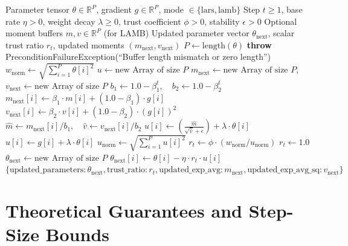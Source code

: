 \documentclass[11pt,a4paper]{article}
\theoremstyle{definition}
\begin{document}
\begin{algorithm}[H]
\caption{Layer-Wise Adaptive Optimization (LARS / LAMB)}
\begin{algorithmic}[1]
\Require Parameter tensor $\theta \in \mathbb{R}^P$, gradient $g \in \mathbb{R}^P$, mode $\in \{\text{lars}, \text{lamb}\}$
\Require Step $t \ge 1$, base rate $\eta > 0$, weight decay $\lambda \ge 0$, trust coefficient $\phi > 0$, stability $\epsilon > 0$
\Require Optional moment buffers $m, v \in \mathbb{R}^P$ (for LAMB)
\Ensure Updated parameter vector $\theta_{\text{next}}$, scalar trust ratio $r_t$, updated moments $(m_{\text{next}}, v_{\text{next}})$
\State $P \gets \text{length}(\theta)$
    \State \textbf{throw} PreconditionFailureException(``Buffer length mismatch or zero length'')
\EndIf
\State $w_{\text{norm}} \gets \sqrt{\sum_{i=1}^P \theta[i]^2}$
\State $u \gets \text{new Array of size } P$
\State $m_{\text{next}} \gets \text{new Array of size } P$, \quad $v_{\text{next}} \gets \text{new Array of size } P$
    \State $b_1 \gets 1.0 - \beta_1^t, \quad b_2 \gets 1.0 - \beta_2^t$
        \State $m_{\text{next}}[i] \gets \beta_1 \cdot m[i] + (1.0 - \beta_1) \cdot g[i]$
        \State $v_{\text{next}}[i] \gets \beta_2 \cdot v[i] + (1.0 - \beta_2) \cdot (g[i])^2$
        \State $\hat{m} \gets m_{\text{next}}[i] / b_1, \quad \hat{v} \gets v_{\text{next}}[i] / b_2$
        \State $u[i] \gets \left(\frac{\hat{m}}{\sqrt{\hat{v}} + \epsilon}\right) + \lambda \cdot \theta[i]$
    \EndFor
\Else
        \State $u[i] \gets g[i] + \lambda \cdot \theta[i]$
    \EndFor
\EndIf
\State $u_{\text{norm}} \gets \sqrt{\sum_{i=1}^P u[i]^2}$
    \State $r_t \gets \phi \cdot (w_{\text{norm}} / u_{\text{norm}})$
\Else
    \State $r_t \gets 1.0$
\EndIf
\State $\theta_{\text{next}} \gets \text{new Array of size } P$
    \State $\theta_{\text{next}}[i] \gets \theta[i] - \eta \cdot r_t \cdot u[i]$
\EndFor
\State \Return $\{\text{updated\_parameters}: \theta_{\text{next}}, \text{trust\_ratio}: r_t, \text{updated\_exp\_avg}: m_{\text{next}}, \text{updated\_exp\_avg\_sq}: v_{\text{next}}\}$
\end{algorithmic}
\end{algorithm}

\section{Theoretical Guarantees and Step-Size Bounds}
\end{document}
